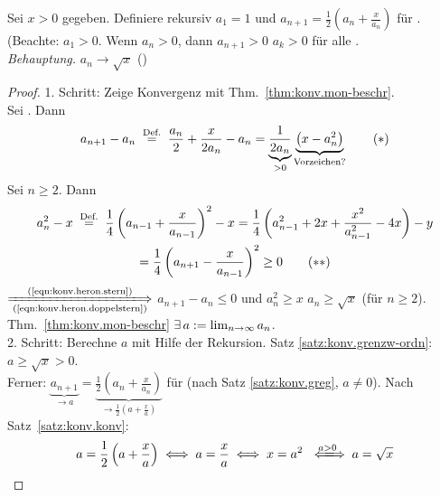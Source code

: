 \documentclass[12pt]{scrreprt}
\begin{document}
\begin{bsp}
  \label{bsp:konv.heron}
  Sei $x>0$ gegeben. Definiere rekursiv $a_1=1$ und
  $a_{n+1}=\frac12(a_n+\frac{x}{a_n})$ für . (Beachte:
  $a_1>0$. Wenn $a_n>0$, dann $a_{n+1}>0$  $a_k>0$
  für alle .  \\\emph{Behauptung.} $a_n\to\sqrt{x}$ (\ninf)
  \begin{proof}
    1. Schritt: Zeige Konvergenz mit Thm.~\ref{thm:konv.mon-beschr}.\\
    Sei . Dann
    \begin{equation} \label{eqn:konv.heron.stern} a_{n+1}-a_n
      \nach{=}{Def.} \frac{a_n}{2} + \frac{x}{2a_n}-a_n =
      \underbrace{\frac{1}{2a_n}}_{>0}
      \underbrace{\left(x-a_n^2\right)}_{\text{Vorzeichen?}}
      \tag{$*$} \end{equation} Sei $n\ge2$. Dann
    \begin{multline*} \label{eqn:konv.heron.doppelstern} a_n^2 - x
      \nach{=}{Def.} \frac14 \left( a_{n-1} + \frac{x}{a_{n-1}}
      \right)^2 - x = \frac14 \left( a_{n-1}^2 + 2x +
        \frac{x^2}{a_{n-1}^2} - 4x\right) - y \\= \frac14 \left(
        a_{n+1} - \frac{x}{a_{n-1}} \right)^2 \ge 0
      \tag{$**$} \end{multline*}
    $\xLongrightarrow[\text{(\ref{eqn:konv.heron.doppelstern})}]{\text{(\ref{eqn:konv.heron.stern})}}$
    $a_{n+1}-a_n \le 0$ und $a_n^2 \ge x$
    \folgtnach{\ref{satz:zahlen.potenzen}} $a_n \ge \sqrt{x}$ (für
    $n\ge2$).\\Thm.~\ref{thm:konv.mon-beschr} \folgt
    $\exists\,a:=\lim_{n\rightarrow\infty}{a_n}$.\\
    2. Schritt: Berechne $a$ mit Hilfe der Rekursion. Satz
    \ref{satz:konv.grenzw-ordn}: $a \ge \sqrt{x} > 0$.\\Ferner:
    $\underbrace{a_{n+1}}_{\to
      a}=\underbrace{\frac12\left(a_n+\frac{x}{a_n}\right)}_{\to
      \frac12\left(a+\frac{x}{a}\right)}$ für \ninf (nach Satz
    \ref{satz:konv.greg}, $a\ne0$). Nach Satz~\ref{satz:konv.konv}:
    \[a = \frac12\left(a+\frac{x}{a}\right) \gdw a = \frac{x}{a} \gdw
    x = a^2 \gdwwegen{a>0} a = \sqrt{x}\]
  \end{proof}
\end{bsp}
\end{document}
